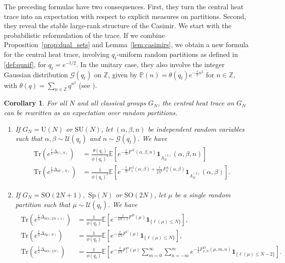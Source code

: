 \documentclass[11pt,a4paper,reqno]{article}
\newtheorem{corollary}[theorem]{Corollary}
\theoremstyle{definition}
\theoremstyle{remark}
\newcommand\SU{{\mathrm{SU}}}
\newcommand\SO{{\mathrm{SO}}}
\newcommand\Sp{{\mathrm{Sp}}}
\newcommand\U{{\mathrm U}}
\newcommand\Z{{\mathbb Z}}
\newcommand\Tr{\mathrm{Tr}}
\newcommand\Pbb{\mathbb{P}}
\newcommand\E{\mathbb{E}}
\newcommand\Gfr{\mathscr{G}}
\newcommand\Ufr{\mathscr{U}}
\begin{document}
The preceding formulas have two consequences. First, they turn the central heat trace into an expectation with respect to explicit measures on partitions. Second, they reveal the stable
large-rank structure of the Casimir. We start with
the probabilistic reformulation of the trace. If we combine Proposition~\ref{prop:dual_sets} and Lemma~\ref{lem:casimirs}, we obtain a new formula for the central heat trace, involving $q_t$-uniform random partitions as defined in \eqref{def:qunif}, for $q_t = e^{-t/2}$. In the unitary case, they also involve the integer Gaussian distribution $\Gfr(q_t)$ on $\Z$, given by $\Pbb(n)=\theta(q_t)e^{-\frac{t}{2}n^2}$ for $n\in\Z$, with $\theta(q)=\sum_{n\in\Z}q^{n^2}$ (see \cite{LM2}).


\begin{corollary}\label{cor:heat_trace_expectation}
For all $N$ and all classical groups $G_N$, the central heat trace on $G_N$ can be rewritten as an expectation over random partitions.
\begin{enumerate}
\item If $G_N=\U(N)$ or $\SU(N)$, let $(\alpha,\beta,n)$ be independent random variables such that $\alpha,\beta\sim\Ufr(q_t)$ and $n\sim\Gfr(q_t)$. We have
\begin{align}
\begin{split}
\Tr(e^{\frac{t}{2}\Delta_{\U(N)}}) & =\frac{\theta(q_t)}{\phi(q_t)^2}\E\left[e^{-\frac{t}{N}F^{A'}(\alpha,\beta,n)}\mathbf{1}_{\Lambda_N^{(1)}}(\alpha,\beta,n)\right]\\
\Tr(e^{\frac{t}{2}\Delta_{\SU(N)}}) & = \frac{1}{\phi(q_t)^2}\E\left[e^{-\frac{t}{N}F_1^A(\alpha,\beta)+\frac{t}{2N^2}F_2^A(\alpha,\beta)}\mathbf{1}_{\Lambda_N^{(2)}}(\alpha,\beta)\right].
\end{split}
\end{align}
\item If $G_N=\SO(2N+1),$ $\Sp(N)$ or $\SO(2N)$, let $\mu$ be a single random partition such that $\mu\sim\Ufr(q_t)$. We have
\begin{align}
\begin{split}
\Tr\left(e^{\frac{t}{2}\Delta_{\SO(2N+1)}}\right) & = \frac{1}{\phi(q_t)}\E\left[e^{-\frac{t}{2N+1}F^B(\mu)}\mathbf{1}_{\{\ell(\mu)\leq N\}}\right],\\
\Tr\left(e^{\frac{t}{2}\Delta_{\Sp(N)}}\right) & = \frac{1}{\phi(q_t)}\E\left[e^{-\frac{t}{2N}F^C(\mu)}\mathbf{1}_{\{\ell(\mu)\leq N\}}\right],\\
\Tr(e^{\frac{t}{2}\Delta_{\SO(2N)}}) & =\frac{1}{\phi(q_t)}\E\left[e^{-\frac{t}{2N}F_1^D(\mu)}\sum_{m=0}^\infty\sum_{n=-m}^m e^{-\frac{t}{2}F_{2,N}^D(\mu,m,n)}\mathbf{1}_{\{\ell(\mu)\leq N-2\}}\right].
\end{split}
\end{align}
\end{enumerate}
\end{corollary}
\end{document}
